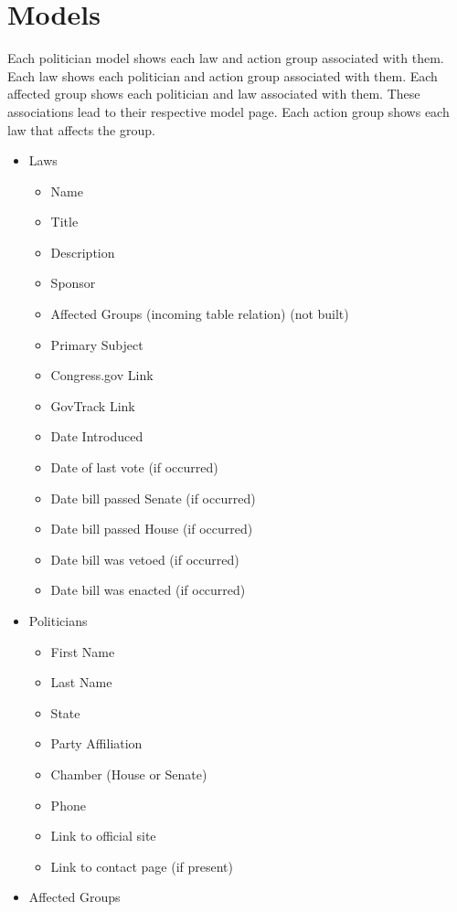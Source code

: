 \documentclass[12pt]{article}
\begin{document}
\section{Models}
    Each politician model shows each law and action group associated with them. Each law shows each politician and action group associated with them. Each affected group shows each politician and law associated with them. These associations lead to their respective model page. Each action group shows each law that affects the group. \\

\begin{itemize}
	\item[] Laws
	\begin{itemize}
		\item Name
		\item Title
		\item Description
		\item Sponsor
		\item Affected Groups (incoming table relation) (not built)
		\item Primary Subject
		\item Congress.gov Link
		\item GovTrack Link
		\item Date Introduced
		\item Date of last vote  (if occurred)
		\item Date bill passed Senate (if occurred)
		\item Date bill passed House (if occurred)
		\item Date bill was vetoed (if occurred)
		\item Date bill was enacted  (if occurred)
	\end{itemize}
	\item[] Politicians
	\begin{itemize}
		\item First Name
		\item Last Name
		\item State
		\item Party Affiliation
		\item Chamber (House or Senate)
		\item Phone
		\item Link to official site
		\item Link to contact page (if present)
	\end{itemize}
	\item[] Affected Groups
	\begin{itemize}

\end{itemize}
\end{itemize}
\end{document}
